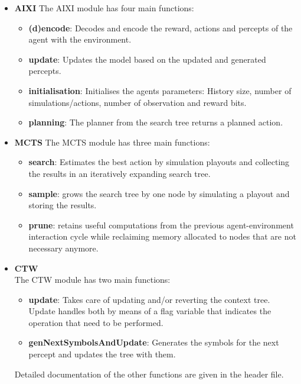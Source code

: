 \documentclass{article}
\theoremstyle{definition}
\newtheorem{primary statistics}[definition]{Primary Statistics}
\newtheorem{auxiliary statistics}[definition]{Auxiliary Statistics}
\begin{document}
\begin{itemize}
    \item \textbf{AIXI} The AIXI module has four main functions: 
    \begin{itemize}
        \item \textbf{(d)encode}: Decodes and encode the reward, actions and percepts of the agent with the environment.
        \item \textbf{update}: Updates the model based on the updated and generated percepts.
        \item \textbf{initialisation}: Initialises the agents parameters: History size, number of simulations/actions, number of observation and reward bits.
        \item \textbf{planning}: The planner from the search tree returns a planned action.
    \end{itemize}
    \item \textbf{MCTS}     The MCTS module has three main functions:
	\begin{itemize}
        \item \textbf{search}: Estimates the best action by simulation playouts and collecting the results in an iteratively expanding search tree.
        \item \textbf{sample}: grows the search tree by one node by simulating a playout and storing the results.
        \item \textbf{prune}: retains useful computations from the previous agent-environment interaction cycle while reclaiming memory allocated to nodes that are not necessary anymore.
    \end{itemize} 
    \item \textbf{CTW}\\
    The CTW module has two main functions: 
    \begin{itemize}
        \item \textbf{update}: Takes care of updating and/or reverting the context tree. Update handles both by means of a flag variable that indicates the operation that need to be performed.
        \item \textbf{genNextSymbolsAndUpdate}: Generates the symbols for the next percept and updates the tree with them.
    \end{itemize}
    Detailed documentation of the other functions are given in the header file.\\


\end{itemize}
\end{document}
